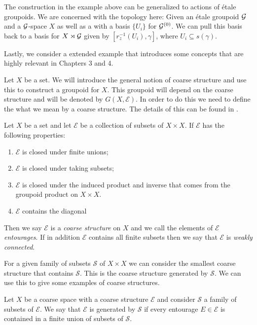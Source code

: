 \begin{example}
The construction in the example above can be generalized to actions of \'etale groupoids. We are concerned with the topology here: Given an \'etale groupoid $\mathcal{G}$ and a $\mathcal{G}$-space $X$ as well as a with a basis $\lbrace U_{i} \rbrace$ for $\mathcal{G}^{(0)}$. We can pull this basis back to a basis for $X \rtimes \mathcal{G}$ given by $[r_{z}^{-1}(U_{i}),\gamma]$, where $U_{i} \subseteq s(\gamma)$.
\end{example}

Lastly, we consider a extended example that introduces some concepts that are highly relevant in Chapters 3 and 4.
\begin{example}\label{ex:CG}
Let $X$ be a set. We will introduce the general notion of coarse structure and use this to construct a groupoid for $X$. This groupoid will depend on the coarse structure and will be denoted by $G(X,\mathcal{E})$. In order to do this we need to define the what we mean by a coarse structure. The details of this can be found in \cite{MR2007488}.

\begin{definition}
Let $X$ be a set and let $\mathcal{E}$ be a collection of subsets of $X \times X$. If $\mathcal{E}$ has the following properties:
\begin{enumerate}
\item $\mathcal{E}$ is closed under finite unions;
\item $\mathcal{E}$ is closed under taking subsets;
\item $\mathcal{E}$ is closed under the induced product and inverse that comes from the groupoid product on $X \times X$.
\item $\mathcal{E}$ contains the diagonal
\end{enumerate}
Then we say $\mathcal{E}$ is a \textit{coarse structure} on $X$ and we call the elements of $\mathcal{E}$ \textit{entourages}. If in addition $\mathcal{E}$ contains all finite subsets then we say that $\mathcal{E}$ is \textit{weakly connected}.
\end{definition}

For a given family of subsets $\mathcal{S}$ of $X \times X$ we can consider the smallest coarse structure that contains $\mathcal{S}$. This is the coarse structure generated by $\mathcal{S}$. We can use this to give some examples of coarse structures.

\begin{definition}
Let $X$ be a coarse space with a coarse structure $\mathcal{E}$ and consider $\mathcal{S}$ a family of subsets of $\mathcal{E}$. We say that $\mathcal{E}$ is generated by $\mathcal{S}$ if every entourage $E \in \mathcal{E}$ is contained in a finite union of subsets of $\mathcal{S}$.
\end{definition}


\end{example}
